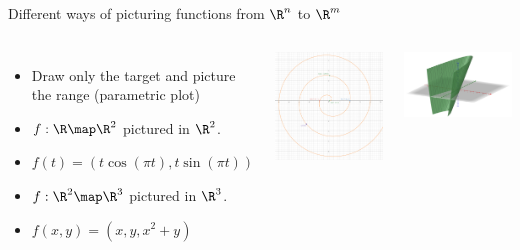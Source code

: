 \documentclass{beamer}
\begin{document}
\begin{frame}{Different ways of picturing functions from $\R^n$ to $\R^m$}

\begin{columns}
\column[T]{5cm}
\begin{itemize}
\item Draw only the target and picture the range (parametric plot)
\item $f:\R\map\R^2$ pictured in $\R^2$.
\item $f(t) = (t \cos(\pi t), t \sin(\pi t))$
\item $f:\R^2\map\R^3$ pictured in $\R^3$.
\item $f(x,y) = (x , y, x^2 + y)$
\end{itemize}

\column[T]{5cm}
\includegraphics[scale=0.1]{spiral}

\includegraphics[scale=0.1]{x-squared-plus-y}

\end{columns}

\end{frame}
\end{document}
